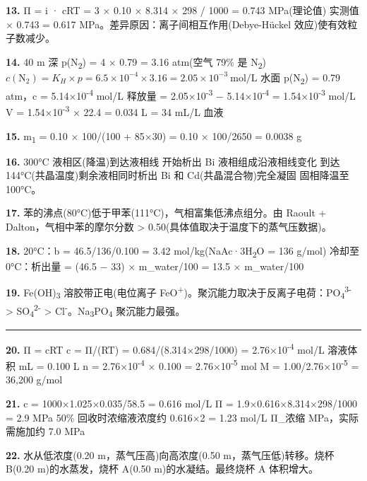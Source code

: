 \textbf{13.} Π = i · cRT = 3 × 0.10 × 8.314 × 298 / 1000 = 0.743 MPa(理论值)
实测值  × 0.743 = 0.617 MPa。差异原因：离子间相互作用(Debye-Hückel 效应)使有效粒子数减少。

\textbf{14.} 40 m 深 p(N\textsubscript{2}) = 4 × 0.79 = 3.16 atm(空气 79\% 是 N\textsubscript{2})
\(c(\mathrm{N_2}) = K_H \times p = 6.5 \times 10^{-4} \times 3.16 = 2.05 \times 10^{-3}\ \mathrm{mol/L}\)
水面 p(N\textsubscript{2}) = 0.79 atm，c = 5.14×10\textsuperscript{-4} mol/L
释放量 = 2.05×10\textsuperscript{-3} − 5.14×10\textsuperscript{-4} = 1.54×10\textsuperscript{-3} mol/L
V = 1.54×10\textsuperscript{-3} × 22.4 = 0.034 L = 34 mL/L 血液

\textbf{15.} m\textsubscript{1} = 0.10 × 100/(100 + 85×30) = 0.10 × 100/2650 = 0.0038 g

\textbf{16.} 300°C \箭 液相区(降温)\箭 到达液相线 \箭 开始析出 Bi \箭 液相组成沿液相线变化 \箭 到达 144°C(共晶温度)\箭 剩余液相同时析出 Bi 和 Cd(共晶混合物)\箭 完全凝固 \箭 固相降温至 100°C。

\textbf{17.} 苯的沸点(80°C)低于甲苯(111°C)，气相富集低沸点组分。由 Raoult + Dalton，气相中苯的摩尔分数 \textgreater{} 0.50(具体值取决于温度下的蒸气压数据)。

\textbf{18.} 20°C：b = 46.5/136/0.100 = 3.42 mol/kg(NaAc·3H\textsubscript{2}O = 136 g/mol)
冷却至 0°C：析出量 = (46.5 − 33) × m\_water/100 = 13.5 × m\_water/100

\textbf{19.} Fe(OH)\textsubscript{3} 溶胶带正电(电位离子 FeO\textsuperscript{+})。聚沉能力取决于反离子电荷：PO\textsubscript{4}\textsuperscript{3-} \textgreater{} SO\textsubscript{4}\textsuperscript{2-} \textgreater{} Cl\textsuperscript{-}。Na\textsubscript{3}PO\textsubscript{4} 聚沉能力最强。

\begin{center}\rule{0.5\linewidth}{0.5pt}\end{center}

\textbf{20.} Π = cRT \箭 c = Π/(RT) = 0.684/(8.314×298/1000) = 2.76×10\textsuperscript{-4} mol/L
溶液体积  mL = 0.100 L
n = 2.76×10\textsuperscript{-4} × 0.100 = 2.76×10\textsuperscript{-5} mol
M = 1.00/2.76×10\textsuperscript{-5} = 36,200 g/mol

\textbf{21.} c = 1000×1.025×0.035/58.5 = 0.616 mol/L
Π = 1.9×0.616×8.314×298/1000 = 2.9 MPa
50\% 回收时浓缩液浓度约 0.616×2 = 1.23 mol/L
Π\_浓缩  MPa，实际需施加约 7.0 MPa

\textbf{22.} 水从低浓度(0.20 m，蒸气压高)向高浓度(0.50 m，蒸气压低)转移。烧杯 B(0.20 m)的水蒸发，烧杯 A(0.50 m)的水凝结。最终烧杯 A 体积增大。

